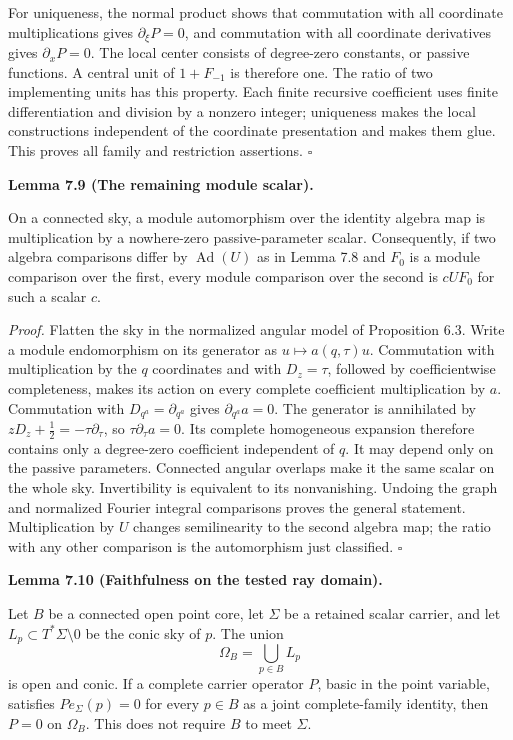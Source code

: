 \documentclass[
  english,
  11pt,
  reqno]{amsart}
\makeatletter
\newcommand{\pandocstatementheading}[1]{%
  \par\if@nobreak\else
    \addpenalty{\@beginparpenalty}%
    \addvspace{.5\baselineskip plus .2\baselineskip minus .2\baselineskip}%
  \fi
  {\normalfont\bfseries #1\par}%
  \nobreak\@afterindenttrue\@afterheading
}
\makeatother
\begin{document}
For uniqueness, the normal product shows that commutation with all
coordinate multiplications gives \(\partial_\xi P=0\), and commutation
with all coordinate derivatives gives \(\partial_xP=0\). The local
center consists of degree-zero constants, or passive functions. A
central unit of \(1+F_{-1}\) is therefore one. The ratio of two
implementing units has this property. Each finite recursive coefficient
uses finite differentiation and division by a nonzero integer;
uniqueness makes the local constructions independent of the coordinate
presentation and makes them glue. This proves all family and restriction
assertions. \hfill\(\square\)

\pandocstatementheading{\leavevmode{}\label{lem:online-module-comparison-scalar}Lemma 7.9 (The remaining module scalar).}

On a connected sky, a module automorphism over the identity algebra map
is multiplication by a nowhere-zero passive-parameter scalar.
Consequently, if two algebra comparisons differ by
\(\operatorname{Ad}(U)\) as in Lemma 7.8 and \(F_0\) is a module
comparison over the first, every module comparison over the second is
\(cUF_0\) for such a scalar \(c\).

\emph{Proof.} Flatten the sky in the normalized angular model of
Proposition 6.3. Write a module endomorphism on its generator as
\(u\mapsto a(q,\tau)u\). Commutation with multiplication by the \(q\)
coordinates and with \(D_z=\tau\), followed by coefficientwise
completeness, makes its action on every complete coefficient
multiplication by \(a\). Commutation with \(D_{q^a}=\partial_{q^a}\)
gives \(\partial_{q^a}a=0\). The generator is annihilated by
\(zD_z+\tfrac12=-\tau\partial_\tau\), so \(\tau\partial_\tau a=0\). Its
complete homogeneous expansion therefore contains only a degree-zero
coefficient independent of \(q\). It may depend only on the passive
parameters. Connected angular overlaps make it the same scalar on the
whole sky. Invertibility is equivalent to its nonvanishing. Undoing the
graph and normalized Fourier integral comparisons proves the general
statement. Multiplication by \(U\) changes semilinearity to the second
algebra map; the ratio with any other comparison is the automorphism
just classified. \hfill\(\square\)

\pandocstatementheading{\leavevmode{}\label{lem:online-full-point-family-faithfulness}Lemma 7.10 (Faithfulness on the tested ray domain).}

Let \(B\) be a connected open point core, let \(\Sigma\) be a retained
scalar carrier, and let \(L_p\subset T^*\Sigma\setminus0\) be the conic
sky of \(p\). The union%
 \[
\Omega_B=\bigcup_{p\in B}L_p
\] is open and conic. If a complete carrier operator \(P\), basic in the
point variable, satisfies \(P e_\Sigma(p)=0\) for every \(p\in B\) as a
joint complete-family identity, then \(P=0\) on \(\Omega_B\). This does
not require \(B\) to meet \(\Sigma\).
\end{document}
